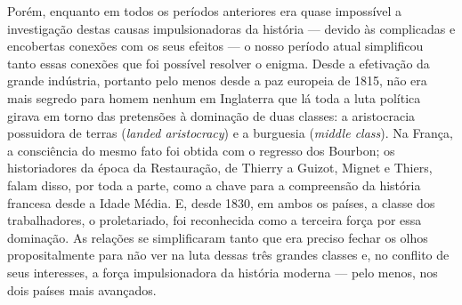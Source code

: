 Porém, enquanto em todos os períodos anteriores era quase impossível a
investigação destas causas impulsionadoras da história --- devido às
complicadas e encobertas conexões com os seus efeitos --- o nosso período
atual simplificou tanto essas conexões que foi possível resolver o
enigma. Desde a efetivação da grande indústria, 
portanto pelo menos desde a paz europeia de 1815, não era mais segredo
para homem nenhum em Inglaterra que lá toda a luta política girava em
torno das pretensões à dominação de duas classes: a aristocracia
possuidora de terras (\emph{landed
aristocracy}) e a burguesia (\emph{middle
class}). Na França, a consciência do mesmo
fato foi obtida com o regresso dos Bourbon; os historiadores da época
da Restauração, de Thierry a Guizot, Mignet e Thiers,
falam disso, por toda a parte, como a chave para a compreensão da %
história francesa desde a Idade Média. E, desde 1830, em ambos os
países, a classe dos trabalhadores, o proletariado, foi reconhecida como
a terceira força por essa dominação. As relações se 
simplificaram tanto que era preciso fechar os olhos propositalmente para
não ver na luta dessas três grandes classes e, no conflito de seus
interesses, a força impulsionadora da história moderna --- pelo menos, nos
dois países mais avançados.\est\

